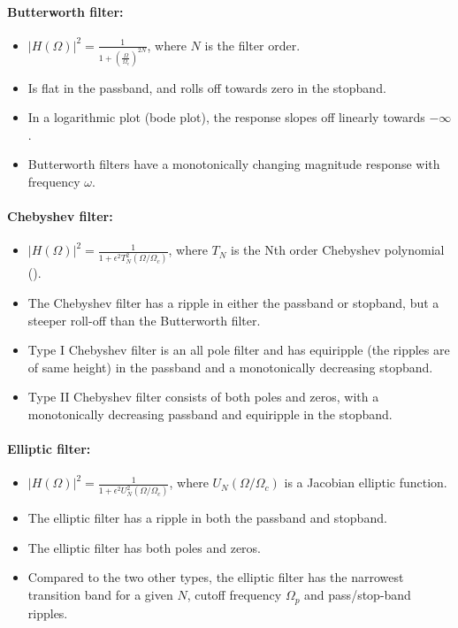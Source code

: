 \documentclass{article}
\begin{document}
\paragraph{Butterworth filter:}
\begin{itemize}
    \item $ |H(\Omega)|^2 = \frac{1}{1+\left(\frac{\Omega}{\Omega_c}\right)^{2N}}$, where $N$ is the filter order.
    \item Is flat in the passband, and rolls off towards zero in the stopband.
    \item In a logarithmic plot (bode plot), the response slopes off linearly towards $-\infty$.
    \item Butterworth filters have a monotonically changing magnitude response with frequency $\omega$.
\end{itemize}

\paragraph{Chebyshev filter:}
\begin{itemize}
    \item $|H(\Omega)|^2 = \frac{1}{1 + \epsilon^2 T_N^2 (\Omega / \Omega_c)}$, where $T_N$ is the Nth order Chebyshev polynomial ().
    \item The Chebyshev filter has a ripple in either the passband or stopband, but a steeper roll-off than the Butterworth filter.
    \item Type I Chebyshev filter is an all pole filter and has equiripple (the ripples are of same height) in the passband and a monotonically decreasing stopband.
    \item Type II Chebyshev filter consists of both poles and zeros, with a monotonically decreasing passband and equiripple in the stopband.
\end{itemize}

\paragraph{Elliptic filter:}
\begin{itemize}
    \item $|H(\Omega)|^2 = \frac{1}{1 + \epsilon^2 U_N^2 (\Omega / \Omega_c ) }$, where $U_N(\Omega / \Omega_c)$ is a Jacobian elliptic function.
    \item The elliptic filter has a ripple in both the passband and stopband.
    \item The elliptic filter has both poles and zeros.
    \item Compared to the two other types, the elliptic filter has the narrowest transition band for a given $N$, cutoff frequency $\Omega_p$ and pass/stop-band ripples.
\end{itemize}
\end{document}
